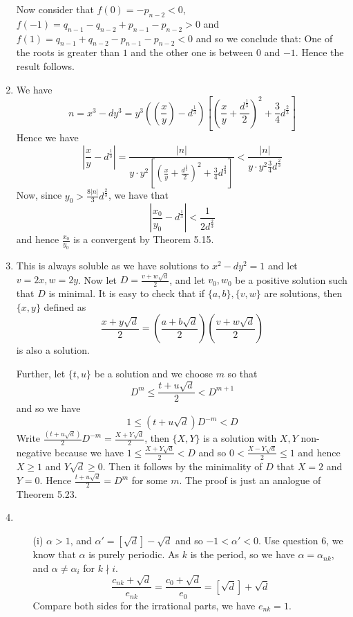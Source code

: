 \begin{enumerate}
      Now consider that $f(0)=-p_{n-2}<0$, $f(-1)=q_{n-1}-q_{n-2}+p_{n-1}-p_{n-2}>0$ and
      $f(1)=q_{n-1}+q_{n-2}-p_{n-1}-p_{n-2}<0$ and so we conclude that:
      One of the roots is greater than $1$ and the other one is between $0$ and $-1$.
      Hence the result follows.
\item We have
      $$n=x^3-dy^3=y^3\left(\left(\frac{x}{y}\right)-d^{\frac{1}{3}}\right)
      \left[\left(\frac{x}{y}+\frac{d^{\frac{1}{3}}}{2}\right)^2+\frac{3}{4}d^{\frac{2}{3}}\right]$$
      Hence we have
      $$\left|\frac{x}{y}-d^{\frac{1}{3}}\right|=\frac{|n|}{y \cdot y^2
      \left[\left(\frac{x}{y}+\frac{d^{\frac{1}{3}}}{2}\right)^2+\frac{3}{4}d^{\frac{2}{3}}\right]}
      <\frac{|n|}{y\cdot y^2 \frac{3}{4}d^{\frac{2}{3}}}$$
      Now, since $y_0>\frac{8|n|}3d^{\frac{2}{3}}$, we have that
      $$\left|\frac{x_0}{y_0}-d^{\frac{1}{3}}\right|<\frac{1}{2d^{\frac{2}{3}}}$$
      and hence $\frac{x_0}{y_0}$ is a convergent by Theorem 5.15.
\item This is always soluble as we have solutions to $x^2-dy^2=1$ and let $v=2x,w=2y$.
      Now let $D=\frac{v+w\sqrt{d}}{2}$, and let $v_0,w_0$ be a positive solution such that $D$ is minimal.
      It is easy to check that if $\{a,b\},\{v,w\}$ are solutions, then
      $\{x,y\}$ defined as
      $$\frac{x+y\sqrt{d}}{2}=\left(\frac{a+b\sqrt{d}}{2}\right)\left(\frac{v+w\sqrt{d}}{2}\right)$$
      is also a solution.

      Further, let $\{t,u\}$ be a solution and we choose $m$ so that
      $$D^m \le \frac{t+u\sqrt{d}}{2} <D^{m+1}$$
      and so we have
      $$1 \le \left(t+u\sqrt{d}\right)D^{-m} < D$$
      Write $\frac{(t+u\sqrt{d})}{2}D^{-m}=\frac{X+Y\sqrt{d}}{2}$, then $\{X,Y\}$ is a solution with $X,Y$ non-negative because we have $1 \le \frac{X+Y\sqrt{d}}{2} <D$ and
      so $0<\frac{X-Y\sqrt{d}}{2} \le 1$ and hence $X \ge 1$ and $Y\sqrt{d} \ge 0$. Then it follows by the minimality of $D$ that $X=2$ and $Y=0$. Hence $\frac{t+u\sqrt{d}}{2}=D^m$ for some $m$.
      The proof is just an analogue of Theorem 5.23.
\item \begin{enumerate}
      \item[(i)]
      $\alpha>1$, and $\alpha'=[\sqrt{d}]-\sqrt{d}$ and so $-1<\alpha'<0$. Use question $6$, we know
      that $\alpha$ is purely periodic. As $k$ is the period, so we have $\alpha=\alpha_{nk}$, and
      $\alpha \neq \alpha_i$ for $k \nmid i$.
      $$\frac{c_{nk}+\sqrt{d}}{e_{nk}}=\frac{c_0+\sqrt{d}}{e_0}=[\sqrt{d}]+\sqrt{d}$$
      Compare both sides for the irrational parts, we have $e_{nk}=1$.


\end{enumerate}
\end{enumerate}
